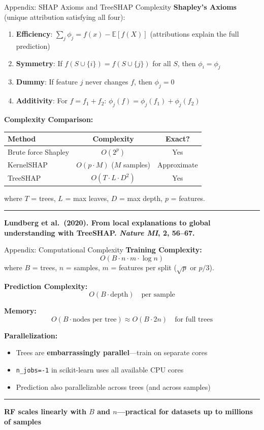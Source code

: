 \documentclass[8pt,aspectratio=169]{beamer}
\newcommand{\bottomnote}[1]{%
\vfill
\vspace{-2mm}
\textcolor{mllavender2}{\rule{\textwidth}{0.4pt}}
\vspace{1mm}
\footnotesize
\textbf{#1}
}
\begin{document}
\begin{frame}[t]{Appendix: SHAP Axioms and TreeSHAP Complexity}
\textbf{Shapley's Axioms} (unique attribution satisfying all four):
\begin{enumerate}
\item \textbf{Efficiency}: $\sum_j \phi_j = f(x) - \mathbb{E}[f(X)]$ (attributions explain the full prediction)
\item \textbf{Symmetry}: If $f(S \cup \{i\}) = f(S \cup \{j\})$ for all $S$, then $\phi_i = \phi_j$
\item \textbf{Dummy}: If feature $j$ never changes $f$, then $\phi_j = 0$
\item \textbf{Additivity}: For $f = f_1 + f_2$: $\phi_j(f) = \phi_j(f_1) + \phi_j(f_2)$
\end{enumerate}

\vspace{0.3em}
\textbf{Complexity Comparison:}
\begin{center}
\begin{tabular}{lcc}
\toprule
\textbf{Method} & \textbf{Complexity} & \textbf{Exact?} \\
\midrule
Brute force Shapley & $O(2^p)$ & Yes \\
KernelSHAP & $O(p \cdot M)$ ($M$ samples) & Approximate \\
TreeSHAP & $O(T \cdot L \cdot D^2)$ & Yes \\
\bottomrule
\end{tabular}
\end{center}
where $T$ = trees, $L$ = max leaves, $D$ = max depth, $p$ = features.
\bottomnote{Lundberg et al.\ (2020). From local explanations to global understanding with TreeSHAP. \textit{Nature MI}, 2, 56--67.}
\end{frame}

\begin{frame}[t]{Appendix: Computational Complexity}
\textbf{Training Complexity:}
\[
O(B \cdot n \cdot m \cdot \log n)
\]
where $B$ = trees, $n$ = samples, $m$ = features per split ($\sqrt{p}$ or $p/3$).

\vspace{0.3em}
\textbf{Prediction Complexity:}
\[
O(B \cdot \text{depth}) \quad \text{per sample}
\]

\textbf{Memory:}
\[
O(B \cdot \text{nodes per tree}) \approx O(B \cdot 2n) \quad \text{for full trees}
\]

\vspace{0.3em}
\textbf{Parallelization:}
\begin{itemize}
\item Trees are \textbf{embarrassingly parallel}---train on separate cores
\item \texttt{n\_jobs=-1} in scikit-learn uses all available CPU cores
\item Prediction also parallelizable across trees (and across samples)
\end{itemize}
\bottomnote{RF scales linearly with $B$ and $n$---practical for datasets up to millions of samples}
\end{frame}
\end{document}
